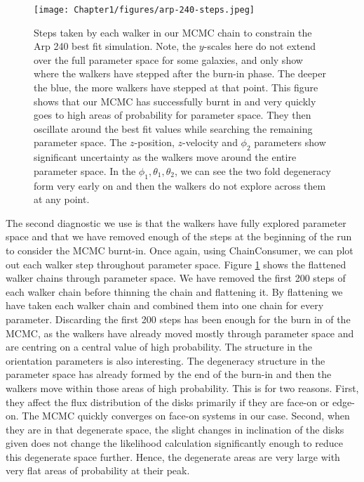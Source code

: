 \begin{figure}
\centering
\texttt{[image: Chapter1/figures/arp-240-steps.jpeg]}
\caption[Steps taken by each walker in our MCMC chain to constrain the Arp 240 best fit simulation.]{Steps taken by each walker in our MCMC chain to constrain the Arp 240 best fit simulation. Note, the $y$-scales here do not extend over the full parameter space for some galaxies, and only show where the walkers have stepped after the burn-in phase. The deeper the blue, the more walkers have stepped at that point. This figure shows that our MCMC has successfully burnt in and very quickly goes to high areas of probability for parameter space. They then oscillate around the best fit values while searching the remaining parameter space. The $z$-position, $z$-velocity and $\phi_{2}$ parameters show significant uncertainty as the walkers move around the entire parameter space. In the $\phi_{1}, \theta_{1}, \theta_{2}$, we can see the two fold degeneracy form very early on and then the walkers do not explore across them at any point.}
\label{fig:walker_steps}
\end{figure}

The second diagnostic we use is that the walkers have fully explored parameter space and that we have removed enough of the steps at the beginning of the run to consider the MCMC burnt-in. Once again, using ChainConsumer, we can plot out each walker step throughout parameter space. Figure \ref{fig:walker_steps} shows the flattened walker chains through parameter space. We have removed the first 200 steps of each walker chain before thinning the chain and flattening it. By flattening we have taken each walker chain and combined them into one chain for every parameter. Discarding the first 200 steps has been enough for the burn in of the MCMC, as the walkers have already moved mostly through parameter space and are centring on a central value of high probability. The structure in the orientation parameters is also interesting. The degeneracy structure in the parameter space has already formed by the end of the burn-in and then the walkers move within those areas of high probability. This is for two reasons. First, they affect the flux distribution of the disks primarily if they are face-on or edge-on. The MCMC quickly converges on face-on systems in our case. Second, when they are in that degenerate space, the slight changes in inclination of the disks given does not change the likelihood calculation significantly enough to reduce this degenerate space further. Hence, the degenerate areas are very large with very flat areas of probability at their peak.


